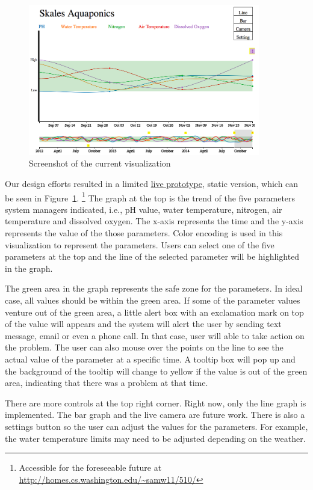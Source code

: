 \documentclass{sigchi}
\begin{document}
\begin{figure}
\centering
\includegraphics[width=0.9\textwidth]{Visualization_Screenshot}
\caption{Screenshot of the current visualization}
\label{fig:visualization}
\end{figure}

Our design efforts resulted in a limited \href{http://homes.cs.washington.edu/~samw11/510/}{live prototype}, static version, which can be seen in Figure~\ref{fig:visualization}. 
\footnote{Accessible for the foreseeable future at \url{http://homes.cs.washington.edu/~samw11/510/}} The graph at the top is the trend of the five parameters system managers indicated, i.e., pH value, water temperature, nitrogen, air temperature and dissolved oxygen. The x-axis represents the time and the y-axis represents the value of the those parameters. Color encoding is used in this visualization to represent the parameters. Users can select one of the five parameters at the top and the line of the selected parameter will be highlighted in the graph. 

The green area in the graph represents the safe zone for the parameters. In ideal case, all values should be within the green area. If some of the parameter values venture out of the green area, a little alert box with an exclamation mark on top of the value will appears and the system will alert the user by sending text message, email or even a phone call. In that case, user will able to take action on the problem. The user can also mouse over the points on the line to see the actual value of the parameter at a specific time. A tooltip box will pop up and the background of the tooltip will change to yellow if the value is out of the green area, indicating that there was a problem at that time.

There are more controls at the top right corner. Right now, only the line graph is implemented. The bar graph and the live camera are future work. There is also a settings button so the user can adjust the values for the parameters. For example, the water temperature limits may need to be adjusted depending on the weather. 
\end{document}

